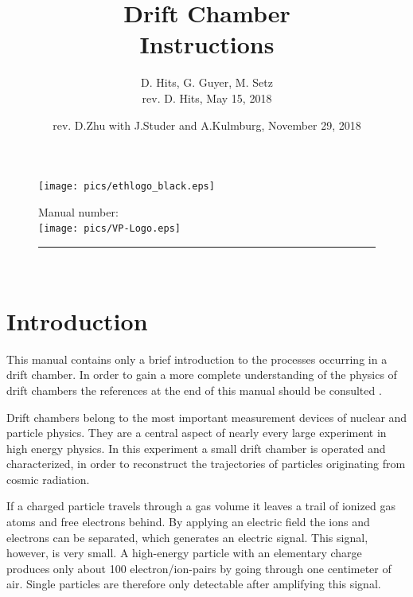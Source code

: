 \documentclass[12pt]{article}
\begin{document}
\begin{figure}
\begin{minipage}{0.5\linewidth}
\begin{flushleft}
\texttt{[image: pics/ethlogo\_black.eps]}
\end{flushleft}
\end{minipage}
\hspace{0.05cm}
\begin{minipage}{0.5\linewidth}
\begin{flushright}
Manual number:\hspace{2cm}\\[0.5cm]
\texttt{[image: pics/VP-Logo.eps]}
\end{flushright}
\end{minipage}
\hrule height 1pt\hfill \\[3cm]
\end{figure} 

\title{Drift Chamber\\ Instructions}

\author{D. Hits, G. Guyer, M. Setz\\
rev. D. Hits, May 15, 2018}
\date{rev. D.Zhu with J.Studer and A.Kulmburg, November 29, 2018}
\maketitle

\newpage
\section{Introduction}

This manual contains only a brief introduction to the processes occurring in a drift chamber. In order to gain a more complete understanding of the physics of drift chambers the references at the end of this manual should be consulted \cite{DriftChamberBook, knoll, NIMwiki}. 

Drift chambers belong to the most important measurement devices of nuclear and particle physics. They are a central aspect of nearly every large experiment in high energy physics. In this experiment a small drift chamber is operated and characterized, in order to reconstruct the trajectories of particles originating from cosmic radiation. 

If a charged particle travels through a gas volume it leaves a trail of ionized gas atoms and free electrons behind. By applying an electric field the ions and electrons can be separated, which generates an electric signal. This signal, however, is very small. A high-energy particle with an elementary charge produces only about 100 electron/ion-pairs by going through one centimeter of air. Single particles are therefore only detectable after amplifying this signal. 
\end{document}
